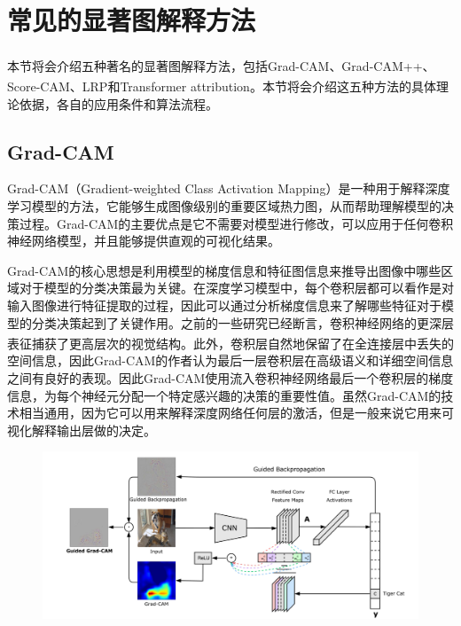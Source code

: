 \section{常见的显著图解释方法}
本节将会介绍五种著名的显著图解释方法，包括Grad-CAM\textsuperscript{\cite{selvaraju2017grad}}、Grad-CAM++\textsuperscript{\cite{chattopadhay2018grad}}、Score-CAM\textsuperscript{\cite{wang2020score}}、LRP\textsuperscript{\cite{binder2016layer}}和Transformer attribution\textsuperscript{\cite{chefer2021transformer}}。本节将会介绍这五种方法的具体理论依据，各自的应用条件和算法流程。 
\subsection{Grad-CAM}\label{sub:gradcam}
Grad-CAM（Gradient-weighted Class Activation Mapping）是一种用于解释深度学习模型的方法，它能够生成图像级别的重要区域热力图，从而帮助理解模型的决策过程。Grad-CAM的主要优点是它不需要对模型进行修改，可以应用于任何卷积神经网络模型，并且能够提供直观的可视化结果。

Grad-CAM的核心思想是利用模型的梯度信息和特征图信息来推导出图像中哪些区域对于模型的分类决策最为关键。在深度学习模型中，每个卷积层都可以看作是对输入图像进行特征提取的过程，因此可以通过分析梯度信息来了解哪些特征对于模型的分类决策起到了关键作用。之前的一些研究已经断言，卷积神经网络的更深层表征捕获了更高层次的视觉结构\textsuperscript{\cite{bengio2013representation,mahendran2016visualizing}}。此外，卷积层自然地保留了在全连接层中丢失的空间信息，因此Grad-CAM的作者认为最后一层卷积层在高级语义和详细空间信息之间有良好的表现。因此Grad-CAM使用流入卷积神经网络最后一个卷积层的梯度信息，为每个神经元分配一个特定感兴趣的决策的重要性值。虽然Grad-CAM的技术相当通用，因为它可以用来解释深度网络任何层的激活，但是一般来说它用来可视化解释输出层做的决定。

\begin{figure}[h]
	\centering 
	\includegraphics[width=15cm]{fig/ch2/gradcam1.png}
	\label{fig:gradcam1}
\end{figure}

